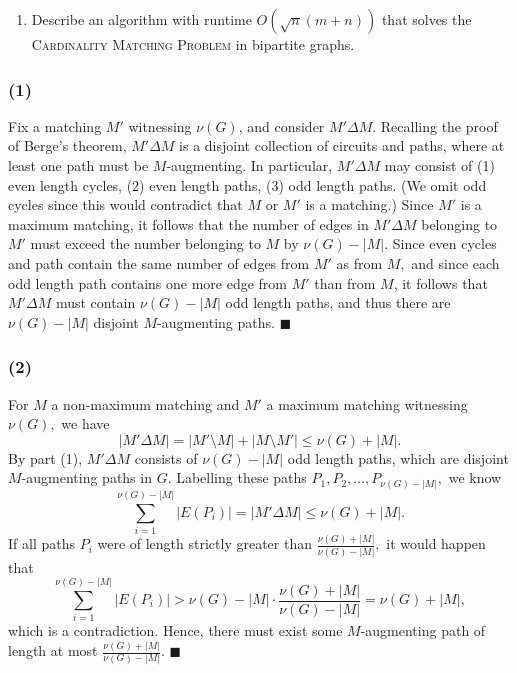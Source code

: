 \documentclass{article}
\begin{document}
\begin{centerframebox}
\begin{enumerate}[resume]
      \item Describe an algorithm with runtime $O(\sqrt{n}(m + n))$ that solves the \textsc{Cardinality Matching Problem} in bipartite graphs.
    \end{enumerate}
  \end{centerframebox}

  \subsubsection*{(1)} Fix a matching $M'$ witnessing $\nu(G)$, and consider $M'\Delta M.$ Recalling the proof of Berge's theorem, $M'\Delta M$ is a disjoint collection of circuits and paths, where at least one path must be $M$-augmenting. In particular, $M'\Delta M$ may consist of (1) even length cycles, (2) even length paths, (3) odd length paths. (We omit odd cycles since this would contradict that $M$ or $M'$ is a matching.) Since $M'$ is a maximum matching, it follows that the number of edges in $M'\Delta M$ belonging to $M'$ must exceed the number belonging to $M$ by $\nu(G)-|M|.$ Since even cycles and path contain the same number of edges from $M'$ as from $M,$ and since each odd length path contains one more edge from $M'$ than from $M$, it follows that $M'\Delta M$ must contain $\nu(G)-|M|$ odd length paths, and thus there are $\nu(G)-|M|$ disjoint $M$-augmenting paths. $\blacksquare$

  \subsubsection*{(2)} For $M$ a non-maximum matching and $M'$ a maximum matching witnessing $\nu(G),$ we have $$|M'\Delta M|=|M'\setminus M|+|M\setminus M'|\leq \nu(G)+|M|.$$ By part (1), $M'\Delta M$ consists of $\nu(G)-|M|$ odd length paths, which are disjoint $M$-augmenting paths in $G$. Labelling these paths $P_1,P_2,\dots, P_{\nu(G)-|M|},$ we know $$\sum_{i=1}^{\nu(G)-|M|} |E(P_i)| = |M'\Delta M|\leq \nu(G)+|M|.$$ If all paths $P_i$ were of length strictly greater than $\frac{\nu(G)+|M|}{\nu(G)-|M|},$ it would happen that
  $$\sum_{i=1}^{\nu(G)-|M|} |E(P_i)| > \nu(G)-|M|\cdot \frac{\nu(G)+|M|}{\nu(G)-|M|}=\nu(G)+|M|,$$which is a contradiction. Hence, there must exist some $M$-augmenting path of length at most $\frac{\nu(G)+|M|}{\nu(G)-|M|}$. $\blacksquare$
\end{document}
